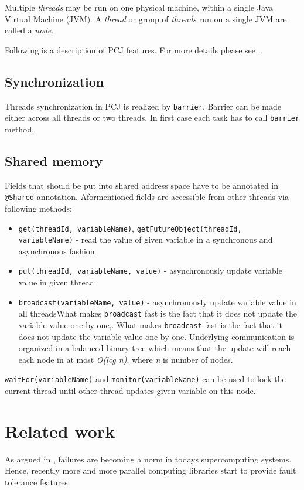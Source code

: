 \documentclass{llncs}
\newcommand{\inlinecode}{\texttt}
\begin{document}
Multiple \emph{threads} may be run on one physical machine, within a single Java Virtual Machine (JVM).
A \emph{thread} or group of \emph{threads} run on a single JVM are called a \emph{node}.

Following is a description of PCJ features. For more details please see \cite{pcj-manual}.
\subsection{Synchronization}
Threads synchronization in PCJ is realized by \inlinecode{barrier}.
Barrier can be made either across all threads or two threads.
In first case each task has to call \inlinecode{barrier} method.
\subsection{Shared memory}
Fields that should be put into shared address space have to be annotated in \inlinecode{@Shared} annotation.
Aformentioned fields are accessible from other threads via following methods:
\vspace{-2mm}
\begin{itemize}
\item\inlinecode{get(threadId, variableName)}, \inlinecode{getFutureObject(threadId, variableName)} - read the value of given variable
in a synchronous and asynchronous fashion
\item\inlinecode{put(threadId, variableName, value)} - asynchronously update variable value in given thread.
\item\inlinecode{broadcast(variableName, value)}\label{broadcast} - asynchronously update variable value in all threadsWhat makes \inlinecode{broadcast} fast is the fact that it does not update the variable value one by one,.
   What makes \inlinecode{broadcast} fast is the fact that it does not update the variable value one by one.
   Underlying communication is organized in a balanced binary tree which means that the update will reach each node in at most \emph{O(log n)}, where \emph{n} is number of nodes.

\end{itemize}

\inlinecode{waitFor(variableName)} and \inlinecode{monitor(variableName)} can be used to lock the current thread until other thread updates given variable on this node.

\section{Related work}
As argued in \cite{shmem}, failures are becoming a norm in todays supercomputing systems.
Hence, recently more and more parallel computing libraries start to provide fault tolerance features.
\end{document}
